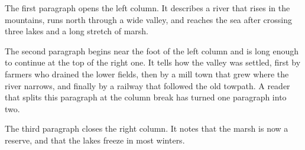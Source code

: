 \documentclass[twocolumn]{article}
\begin{document}

The first paragraph opens the left column. It describes a river that rises in the
mountains, runs north through a wide valley, and reaches the sea after crossing three
lakes and a long stretch of marsh.

The second paragraph begins near the foot of the left column and is long enough to
continue at the top of the right one. It tells how the valley was settled, first by
farmers who drained the lower fields, then by a mill town that grew where the river
narrows, and finally by a railway that followed the old towpath. A reader that splits
this paragraph at the column break has turned one paragraph into two.

The third paragraph closes the right column. It notes that the marsh is now a reserve,
and that the lakes freeze in most winters.
\end{document}
